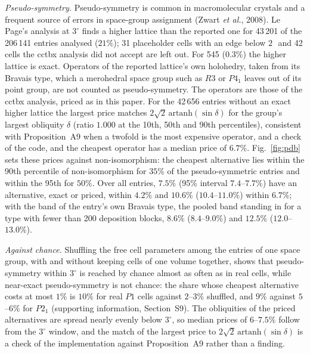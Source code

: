 \emph{Pseudo-symmetry.} Pseudo-symmetry is common in macromolecular crystals and a frequent source of errors in space-group assignment (Zwart \emph{et al.}, 2008). Le Page's analysis at $3^\circ$ finds a higher lattice than the reported one for 43\,201 of the 206\,141 entries analysed ($21\%$); 31 placeholder cells with an edge below $2$\,\Ang\ and 42 cells the cctbx analysis did not accept are left out. For 545 ($0.3\%$) the higher lattice is exact. Operators of the reported lattice's own holohedry, taken from its Bravais type, which a merohedral space group such as $R3$ or $P4_1$ leaves out of its point group, are not counted as pseudo-symmetry. The operators are those of the cctbx analysis, priced as in this paper. For the 42\,656 entries without an exact higher lattice the largest price matches $2\sqrt2\,\mathrm{artanh}(\sin\delta)$ for the group's largest obliquity $\delta$ (ratio $1.000$ at the 10th, 50th and 90th percentiles), consistent with Proposition~A9 when a twofold is the most expensive operator, and a check of the code, and the cheapest operator has a median price of $6.7\%$. Fig.~\ref{fig:pdb} sets these prices against non-isomorphism: the cheapest alternative lies within the 90th percentile of non-isomorphism for $35\%$ of the pseudo-symmetric entries and within the 95th for $50\%$. Over all entries, $7.5\%$ (95\% interval $7.4$--$7.7\%$) have an alternative, exact or priced, within $4.2\%$ and $10.6\%$ ($10.4$--$11.0\%$) within $6.7\%$; with the band of the entry's own Bravais type, the pooled band standing in for a type with fewer than 200 deposition blocks, $8.6\%$ ($8.4$--$9.0\%$) and $12.5\%$ ($12.0$--$13.0\%$).

\emph{Against chance.} Shuffling the free cell parameters among the entries of one space group, with and without keeping cells of one volume together, shows that pseudo-symmetry within $3^\circ$ is reached by chance almost as often as in real cells, while near-exact pseudo-symmetry is not chance: the share whose cheapest alternative costs at most $1\%$ is $10\%$ for real $P1$ cells against $2$--$3\%$ shuffled, and $9\%$ against $5$--$6\%$ for $P2_1$ (supporting information, Section~S9). The obliquities of the priced alternatives are spread nearly evenly below $3^\circ$, so median prices of $6$--$7.5\%$ follow from the $3^\circ$ window, and the match of the largest price to $2\sqrt2\,\mathrm{artanh}(\sin\delta)$ is a check of the implementation against Proposition~A9 rather than a finding.

